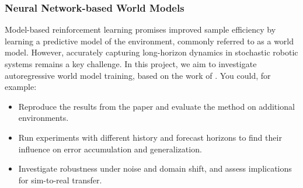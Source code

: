 \documentclass[a4paper]{article}
\begin{document}

\subsubsection{Neural Network-based World Models}

Model-based reinforcement learning promises improved sample efficiency by learning a predictive model of the environment, commonly referred to as a world model. However, accurately capturing long-horizon dynamics in stochastic robotic systems remains a key challenge. In this project, we aim to investigate autoregressive world model training, based on the work of \citet{Li2025robotic}. You could, for example:

\begin{itemize}
  \item Reproduce the results from the paper and evaluate the method on additional environments.
  \item Run experiments with different history and forecast horizons to find their influence on error accumulation and generalization.
  \item Investigate robustness under noise and domain shift, and assess implications for sim-to-real transfer.
\end{itemize}
\end{document}
